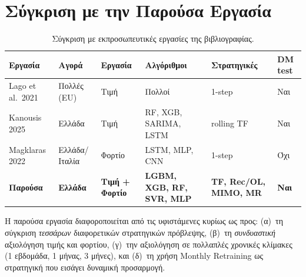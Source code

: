 \section{Σύγκριση με την Παρούσα Εργασία}
\label{sec:comparison}

\begin{table}[H]
\centering
\caption{Σύγκριση με εκπροσωπευτικές εργασίες της βιβλιογραφίας.}
\label{tab:lit_comparison}
\small
\begin{tabularx}{\linewidth}{p{2.8cm} X X X X X}
\toprule
\textbf{Εργασία} & \textbf{Αγορά} & \textbf{Εργασία} & \textbf{Αλγόριθμοι} & \textbf{Στρατηγικές} & \textbf{DM test} \\
\midrule
Lago et al.\ 2021 & Πολλές (EU) & Τιμή & Πολλοί & 1-step & Ναι \\
Kanousis 2025 & Ελλάδα & Τιμή & RF, XGB, SARIMA, LSTM & rolling TF & Ναι \\
Magklaras 2022 & Ελλάδα/Ιταλία & Φορτίο & LSTM, MLP, CNN & 1-step & Όχι \\
\midrule
\textbf{Παρούσα} & \textbf{Ελλάδα} & \textbf{Τιμή + Φορτίο} & \textbf{LGBM, XGB, RF, SVR, MLP} & \textbf{TF, Rec/OL, MIMO, MR} & \textbf{Ναι} \\
\bottomrule
\end{tabularx}
\end{table}

Η παρούσα εργασία διαφοροποιείται από τις υφιστάμενες κυρίως ως προς:
(α)~τη σύγκριση \textit{τεσσάρων} διαφορετικών στρατηγικών πρόβλεψης,
(β)~τη \textit{συνδυαστική} αξιολόγηση τιμής και φορτίου,
(γ)~την αξιολόγηση σε πολλαπλές χρονικές κλίμακες (1 εβδομάδα, 1 μήνας, 3 μήνες), και
(δ)~τη χρήση Monthly Retraining ως στρατηγική που εισάγει δυναμική προσαρμογή.
